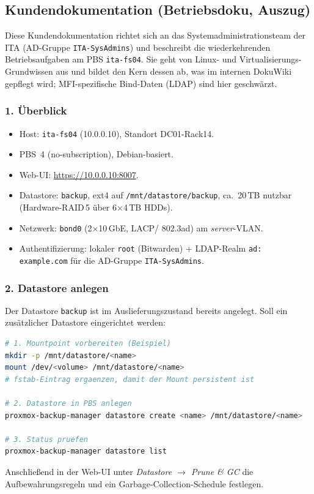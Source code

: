 \clearpage
\subsection{Kundendokumentation (Betriebsdoku, Auszug)}
\label{app:BetriebsDoku}

Diese Kundendokumentation richtet sich an das System\-administrations\-team
der \ac{ITA} (AD-Gruppe \texttt{ITA-SysAdmins}) und beschreibt die
wiederkehrenden Betriebsaufgaben am \ac{PBS} \texttt{ita-fs04}.
Sie geht von Linux- und Virtualisierungs-Grundwissen aus und bildet
den Kern dessen ab, was im internen DokuWiki gepflegt wird;
MFI-spezifische Bind-Daten (LDAP) sind hier geschwärzt.

\subsubsection*{1. Überblick}
\begin{itemize}\setlength{\itemsep}{1pt}
    \item Host: \texttt{ita-fs04} (10.0.0.10), Standort
          DC01-Rack14.
    \item \ac{PBS}~4 (no-subscription), Debian-basiert.
    \item Web-UI: \url{https://10.0.0.10:8007}.
    \item Datastore: \texttt{backup}, ext4 auf
          \texttt{/mnt/datastore/backup}, ca.\ 20\,TB nutzbar
          (Hardware-\ac{RAID}\,5 über 6$\times$4\,TB HDDs).
    \item Netzwerk: \texttt{bond0} (2$\times$10\,GbE, \ac{LACP}/
          802.3ad) am \emph{server}-\ac{VLAN}.
    \item Authentifizierung: lokaler \texttt{root} (Bitwarden) +
          \ac{LDAP}-Realm \texttt{ad: example.com} für die
          \ac{AD}-Gruppe \texttt{ITA-SysAdmins}.
\end{itemize}

\subsubsection*{2. Datastore anlegen}
Der Datastore \texttt{backup} ist im Auslieferungszustand bereits
angelegt. Soll ein zusätzlicher Datastore eingerichtet werden:
\begin{lstlisting}[language=bash,caption={Neuen Datastore anlegen}]
# 1. Mountpoint vorbereiten (Beispiel)
mkdir -p /mnt/datastore/<name>
mount /dev/<volume> /mnt/datastore/<name>
# fstab-Eintrag ergaenzen, damit der Mount persistent ist

# 2. Datastore in PBS anlegen
proxmox-backup-manager datastore create <name> /mnt/datastore/<name>

# 3. Status pruefen
proxmox-backup-manager datastore list
\end{lstlisting}
Anschließend in der Web-UI unter \emph{Datastore $\to$ Prune \& GC}
die Aufbewahrungsregeln und ein Garbage-Collection-Schedule
festlegen.

